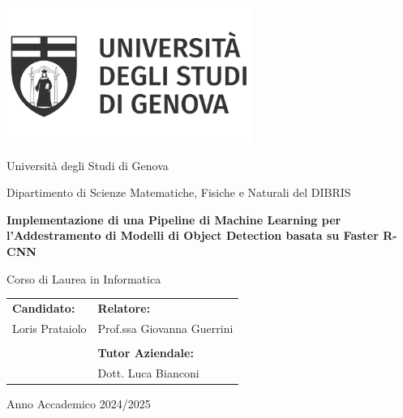 \begin{titlepage}
    \centering

    \vspace*{2cm} 
    \includegraphics[width=0.6\textwidth]{images/universita-degli-studi-di-genova-logo-vector.png} %
    \vspace{1cm}

    {\normalsize Università degli Studi di Genova\par}
    {\normalsize Dipartimento di Scienze Matematiche, Fisiche e Naturali del DIBRIS\par}
    \vspace{1cm}

    {\Large \textbf{Implementazione di una Pipeline di Machine Learning per l'Addestramento di Modelli di Object Detection basata su Faster R-CNN}\par}
    \vspace{1cm}

    {\normalsize Corso di Laurea in Informatica\par}
    \vspace{2cm}

    \begin{tabular}{ll}
        \textbf{Candidato:} & \hspace{5cm}\textbf{Relatore:} \\
        Loris Prataiolo & \hspace{5cm}Prof.ssa Giovanna Guerrini \\
        & \\
        & \hspace{5cm}\textbf{Tutor Aziendale:} \\
        & \hspace{5cm}Dott. Luca Bianconi \\
    \end{tabular}
    \vspace{3cm}

    {\normalsize Anno Accademico 2024/2025\par}

    \vspace*{\fill} 
\end{titlepage}